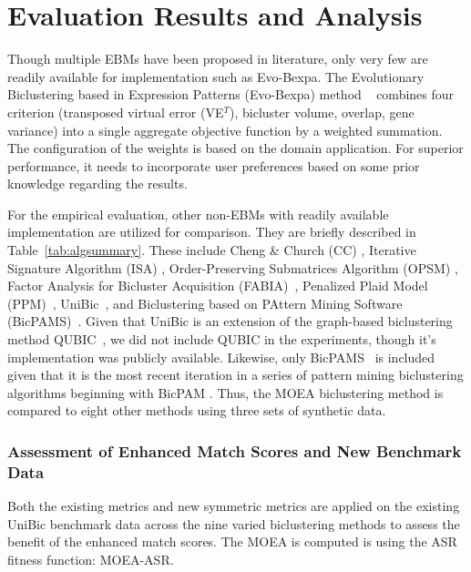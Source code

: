 \section{Evaluation Results and Analysis}
\label{sec:eval}
Though multiple EBMs have been proposed in literature, only very few are readily available for implementation such as Evo-Bexpa. 
The Evolutionary Biclustering based in Expression Patterns (Evo-Bexpa) method ~\cite{pontes2013configurable} combines four criterion (transposed virtual error (VE$^T$), bicluster volume, overlap, gene variance) into a single aggregate objective function by a weighted summation. The configuration of the weights is based on the domain application. For superior performance, it needs to incorporate user preferences based on some prior knowledge regarding the results.

For the empirical evaluation, other non-EBMs with readily available implementation are utilized for comparison. They are briefly described in Table~\ref{tab:algsummary}. 
These include Cheng \& Church (CC) \cite{cheng2000biclustering}, Iterative Signature Algorithm (ISA) \cite{bergmann2003iterative}, Order-Preserving Submatrices Algorithm (OPSM) \cite{ben2003discovering}, Factor Analysis for Bicluster Acquisition (FABIA)~\cite{hochreiter2010fabia}, Penalized Plaid Model (PPM)~\cite{chekouo2015thepenalized}, UniBic~\cite{wang2016unibic}, and Biclustering based on PAttern Mining Software (BicPAMS)~\cite{henriques2017bicpams}.
Given that UniBic is an extension of the graph-based biclustering method QUBIC~\cite{zhang2016qubic}, we did not include QUBIC in the experiments, though it's implementation was publicly available. Likewise, only BicPAMS~\cite{henriques2017bicpams} is included given that it is the most recent iteration in a series of pattern mining biclustering algorithms beginning with BicPAM \cite{henriques2014bicpam}.
Thus, the MOEA biclustering method is compared to eight other methods using three sets of synthetic data.

 

\subsubsection{Assessment of Enhanced Match Scores and New Benchmark Data}

Both the existing metrics and new symmetric metrics are applied on the existing UniBic benchmark data across the nine varied biclustering methods to assess the benefit of the enhanced match scores. The MOEA is computed is using the ASR fitness function: MOEA-ASR. 

